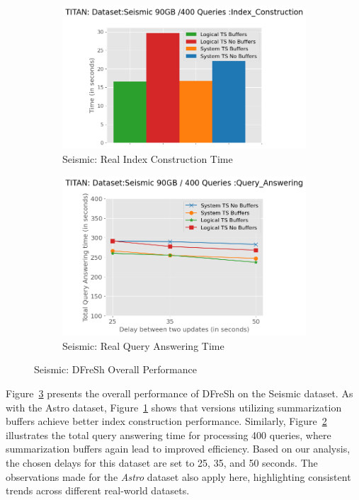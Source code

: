 \begin{figure}
	\centering
	\begin{subfigure}[c]{0.45\textwidth}
		\includegraphics[width=1\textwidth]   {figures/Experiments/Dynamic/SEISMIC/index_construction_seismic.png}
		\caption{Seismic: Real Index Construction Time }
		\label{fig:actual-index-Construction-time-seismic}
	\end{subfigure}
	\begin{subfigure}[c]{0.45\textwidth}
		\includegraphics[width=1\textwidth]	 {figures/Experiments/Dynamic/SEISMIC/query_answering_xaxis.png}
		\caption{Seismic: Real Query Answering Time}
		\label{fig:actual-query-answering-time-seismic}
	\end{subfigure}
	\caption{Seismic: DFreSh Overall Performance}
	\label{fig:dfresh-performance-seismic}
\end{figure}

Figure~\ref{fig:dfresh-performance-seismic} presents the overall performance of DFreSh
on the Seismic dataset. As with the Astro dataset, 
Figure~\ref{fig:actual-index-Construction-time-seismic} shows that versions utilizing 
summarization buffers achieve better index construction performance. Similarly, 
Figure~\ref{fig:actual-query-answering-time-seismic} illustrates the total query
answering time for processing 400 queries, where summarization buffers again lead to
improved efficiency. Based on our analysis, the chosen delays for this dataset are set
to 25, 35, and 50 seconds. The observations made for the \textit{Astro} dataset also 
apply here, highlighting consistent trends across different real-world datasets.


